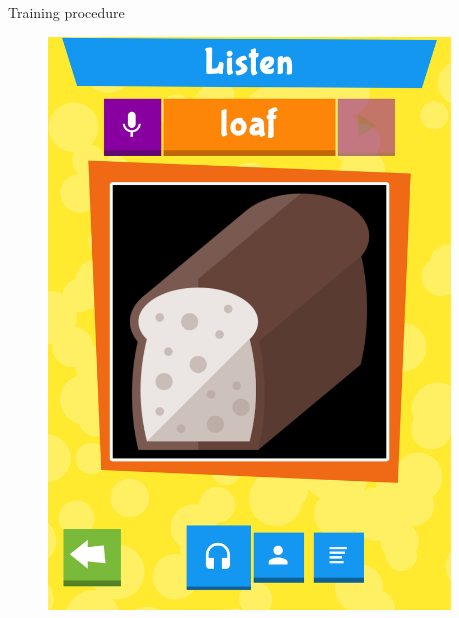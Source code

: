 \documentclass[final,xcolor={cmyk,hyperref}]{beamer}
\begin{document}
\begin{frame}[t]
\begin{columns}[t]
\begin{column}{0.4\linewidth}
\begin{block}{Training procedure}
\begin{figure}[h]
\begin{columns}
\begin{column}{\screenshotwidth}
    \includegraphics[width=\linewidth]{images/CALVin-screenshots/jpgs/word}
  \end{column}
  \begin{column}{\screenshotwidth}

\end{column}
\end{columns}
\end{figure}
\end{block}
\end{column}
\end{columns}
\end{frame}
\end{document}
